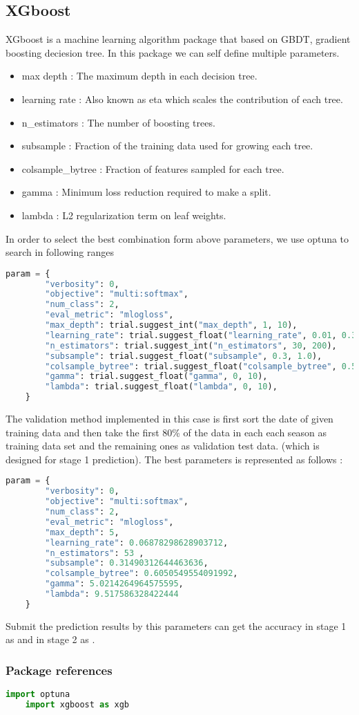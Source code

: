 \subsection*{XGboost}
\quad XGboost is a machine learning algorithm package that based on GBDT, gradient boosting deciesion tree. 
In this package we can self define multiple parameters. 
\begin{itemize}
    \item max depth : The maximum depth in each decision tree.
    \item learning rate : Also known as eta which scales the contribution of each tree.
    \item n\_estimators : The number of boosting trees.
    \item subsample : Fraction of the training data used for growing each tree.
    \item colsample\_bytree : Fraction of features sampled for each tree.
    \item gamma : Minimum loss reduction required to make a split.
    \item lambda : L2 regularization term on leaf weights.
\end{itemize}
\quad In order to select the best combination form above parameters, we use optuna to search in following ranges 
\begin{lstlisting}[language=Python]
    param = {
        "verbosity": 0,
        "objective": "multi:softmax",
        "num_class": 2,
        "eval_metric": "mlogloss",
        "max_depth": trial.suggest_int("max_depth", 1, 10),
        "learning_rate": trial.suggest_float("learning_rate", 0.01, 0.3),
        "n_estimators": trial.suggest_int("n_estimators", 30, 200),
        "subsample": trial.suggest_float("subsample", 0.3, 1.0),
        "colsample_bytree": trial.suggest_float("colsample_bytree", 0.5, 1.0),
        "gamma": trial.suggest_float("gamma", 0, 10),
        "lambda": trial.suggest_float("lambda", 0, 10),
    }
\end{lstlisting}
\quad The validation method implemented in this case is first sort the date of given training data and then take the first 80\% 
of the data in each each season as training data set and the remaining ones as validation test data. (which is designed for stage 1 prediction).
The best parameters is represented as follows : 
\begin{lstlisting}[language=Python]
    param = {
        "verbosity": 0,
        "objective": "multi:softmax",
        "num_class": 2,
        "eval_metric": "mlogloss",
        "max_depth": 5,
        "learning_rate": 0.06878298628903712,
        "n_estimators": 53 ,
        "subsample": 0.31490312644463636,
        "colsample_bytree": 0.6050549554091992,
        "gamma": 5.0214264964575595,
        "lambda": 9.517586328422444
    }
\end{lstlisting}
\quad Submit the prediction results by this parameters can get the accuracy in stage 1 as and in stage 2 as .


\subsubsection{Package references}
\begin{lstlisting}[language=Python]
    import optuna
    import xgboost as xgb
\end{lstlisting}

